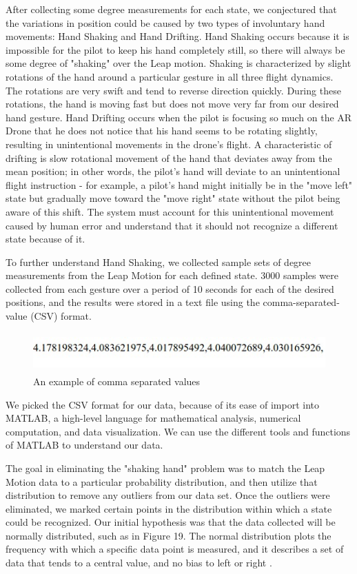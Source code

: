 \documentclass[letterpaper,english, 12pt]{article}
\begin{document}
After collecting some degree measurements for each state, we conjectured that the variations in position could be caused by two types of involuntary hand movements: Hand Shaking and Hand Drifting.  Hand Shaking occurs because it is impossible for the pilot to keep his hand completely still, so there will always be some degree of "shaking" over the Leap motion. Shaking is characterized by slight rotations of the hand around a particular gesture in all three flight dynamics. The rotations are very swift and tend to reverse direction quickly. During these rotations, the hand is moving fast but does not move very far from our desired hand gesture.  Hand Drifting occurs when the pilot is focusing so much on the AR Drone that he does not notice that his hand seems to be rotating slightly, resulting in unintentional movements in the drone's flight. A characteristic of drifting is slow rotational movement of the hand that deviates away from the mean position; in other words, the pilot's hand will deviate to an unintentional flight instruction - for example, a pilot's hand might initially be in the "move left" state but gradually move toward the "move right" state without the pilot being aware of this shift. The system must account for this unintentional movement caused by human error and understand that it should not recognize a different state because of it. 

To further understand Hand Shaking, we collected sample sets of degree measurements from the Leap Motion for each defined state. 3000 samples were collected from each gesture over a period of 10 seconds for each of the desired positions, and the results were stored in a text file using the comma-separated-value (CSV) format.

\begin{figure}[H]
	\centering
	\includegraphics[height=1.5cm,width=130mm]{pics/CSV.jpg}
	\caption{An example of comma separated values}
\end{figure}


We picked the CSV format for our data, because of its ease of import into MATLAB, a high-level language for mathematical analysis, numerical computation, and data visualization.  We can use the different tools and functions of MATLAB to understand our data.
 
The goal in eliminating the "shaking hand" problem was to match the Leap Motion data to a particular probability distribution, and then utilize that distribution to remove any outliers from our data set. Once the outliers were eliminated, we marked certain points in the distribution within which a state could be recognized. Our initial hypothesis was that the data collected will be normally distributed, such as in Figure 19. The normal distribution plots the frequency with which a specific data point is measured, and it describes a set of data that tends to a central value, and no bias to left or right \cite{cit3}.
\end{document}

